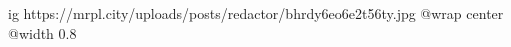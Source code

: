  
 
 
 
 

\ifcmt
  ig https://mrpl.city/uploads/posts/redactor/bhrdy6eo6e2t56ty.jpg
  @wrap center
  @width 0.8
\fi
